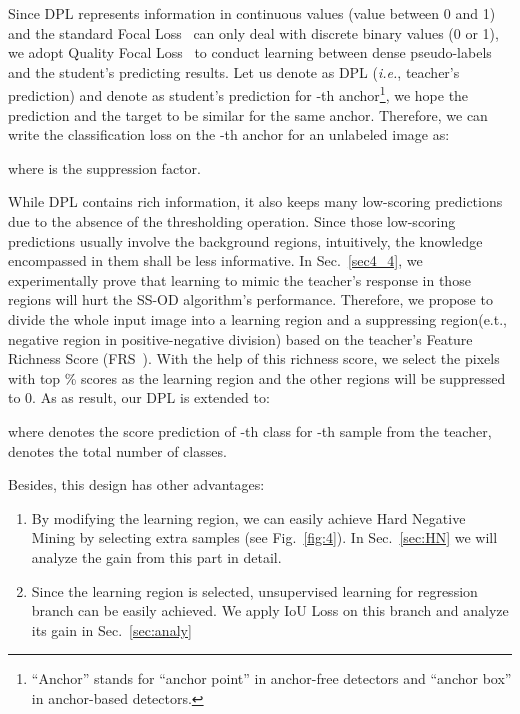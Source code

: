 \documentclass[runningheads]{llncs}
\begin{document}
Since DPL represents information in continuous values (value between 0 and 1) and the standard Focal Loss~\cite{focalloss} can only deal with discrete binary values (0 or 1), we adopt Quality Focal Loss~\cite{gflv1} to conduct learning between dense pseudo-labels and the student's predicting results. Let us denote  as DPL (\emph{i.e.}, teacher's prediction) and denote  as student's prediction for -th anchor\footnote{``Anchor'' stands for ``anchor point'' in anchor-free detectors and ``anchor box'' in anchor-based detectors.}, we hope the prediction and the target to be similar for the same anchor. Therefore, we can write the classification loss on the -th anchor for an unlabeled image as:

where  is the suppression factor. 

While DPL contains rich information, it also keeps many low-scoring predictions due to the absence of the thresholding operation. Since those low-scoring predictions usually involve the background regions, intuitively, the knowledge encompassed in them shall be less informative. In Sec.~\ref{sec4_4}, we experimentally prove that learning to mimic the teacher's response in those regions will hurt the SS-OD algorithm's performance. Therefore, we propose to divide the whole input image into a learning region and a suppressing region(e.t., negative region in positive-negative division) based on the teacher's Feature Richness Score (FRS~\cite{frs}). With the help of this richness score, we select the pixels with top \% scores as the learning region and the other regions will be suppressed to 0. As as result, our DPL is extended to:


where  denotes the score prediction of -th class for -th sample from the teacher,  denotes the total number of classes.



Besides, this design has other advantages: 
\begin{enumerate}
    \item By modifying the learning region, we can easily achieve Hard Negative Mining by selecting extra samples (see Fig.~\ref{fig:4}). In Sec.~\ref{sec:HN} we will analyze the gain from this part in detail.
    \item Since the learning region is selected, unsupervised learning for regression branch can be easily achieved. We apply IoU Loss on this branch and analyze its gain in Sec.~\ref{sec:analy}
\end{enumerate}
\end{document}
